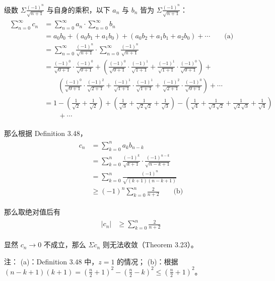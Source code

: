 \documentclass[../poma-notes.tex]{subfiles}
\begin{document}
\begin{anote}
  级数 $\Sigma \frac{(-1)^n}{\sqrt{n+1}}$ 与自身的乘积，以下 $a_n$ 与 $b_n$ 皆为 $\Sigma \frac{(-1)^n}{\sqrt{n+1}}$：
  \begin{align*}
    \begin{split}
      \sum_{n=0}^{\infty} c_n & = \sum_{n=0}^{\infty} a_n \cdot \sum_{n=0}^{\infty} b_n \\
      & = a_0b_0 + (a_0b_1 + a_1b_0) + (a_0b_2+a_1b_1+a_2b_0) + \cdots \qquad \text{(a)} \\
      & = \sum_{n=0}^{\infty} \frac{(-1)^n}{\sqrt{n+1}} \cdot \sum_{n=0}^{\infty} \frac{(-1)^n}{\sqrt{n+1}} \\
      & = \frac{(-1)^0}{\sqrt{0+1}} \cdot \frac{(-1)^0}{\sqrt{0+1}} + (\frac{(-1)^0}{\sqrt{0+1}}
      \cdot \frac{(-1)^1}{\sqrt{1+1}} + \frac{(-1)^1}{\sqrt{1+1}} \cdot \frac{(-1)^0}{\sqrt{0+1}}) + \\
      & \qquad (\frac{(-1)^0}{\sqrt{0+1}} \cdot \frac{(-1)^2}{\sqrt{2+1}} + \frac{(-1)^1}{\sqrt{1+1}} \cdot
      \frac{(-1)^1}{\sqrt{1+1}} + \frac{(-1)^2}{\sqrt{2+1}} \cdot \frac{(-1)^0}{\sqrt{0+1}}) + \cdots \\
      & = 1 - (\frac{1}{\sqrt{2}}+\frac{1}{\sqrt{2}}) + (\frac{1}{\sqrt{3}} + \frac{1}{\sqrt{2}\sqrt{2}} +
      \frac{1}{\sqrt{3}}) - (\frac{1}{\sqrt{4}} + \frac{1}{\sqrt{3}\sqrt{2}} + \frac{1}{\sqrt{2}\sqrt{3}} +
      \frac{1}{\sqrt{4}}) \\ & \qquad + \cdots
    \end{split}
  \end{align*}

  那么根据 Definition 3.48，
  \begin{align*}
    \begin{split}
      c_n & = \sum_{k=0}^{n} a_k b_{n-k} \\
      & = \sum_{k=0}^{n} \frac{(-1)^k}{\sqrt{k+1}} \cdot \frac{(-1)^{n-k}}{\sqrt{n-k+1}} \\
      & = \sum_{k=0}^{n} \frac{(-1)^n}{\sqrt{(k+1)(n-k+1)}} \\
      & \ge (-1)^n \sum_{k=0}^{n} \frac{2}{n+2} \qquad \text{(b)}
    \end{split}
  \end{align*}

  那么取绝对值后有
  \begin{align*}
    \begin{split}
      |c_n| & \ge \sum_{k=0}^{n} \frac{2}{n+2}
    \end{split}
  \end{align*}

  显然 $c_n \to 0$ 不成立，那么 $\Sigma c_n$ 则无法收敛（Theorem 3.23）。

  注：
  (a)：Definition 3.48 中，$z = 1$ 的情况；
  (b)：根据 $(n-k+1)(k+1) = (\frac{n}{2}+1)^2 - (\frac{n}{2}-k)^2 \le (\frac{n}{2}+1)^2$。
\end{anote}
\end{document}

